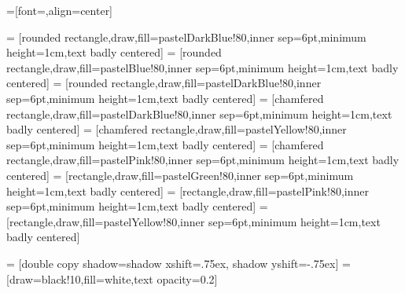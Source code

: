 
=[font=\sffamily,align=center]

\newcommand{\fillOpacity}{80}

\newcommand{\compShape}{rectangle}
\newcommand{\groupShape}{chamfered rectangle}
\newcommand{\procShape}{rounded rectangle}

\newcommand{\explicitColor}{pastelGreen}
\newcommand{\customColor}{pastelYellow}
\newcommand{\implicitColor}{pastelPink}
\newcommand{\optimizationColor}{pastelDarkBlue} %

 = [\procShape,draw,fill=\optimizationColor!\fillOpacity,inner sep=6pt,minimum height=1cm,text badly centered]
 = [\procShape,draw,fill=pastelBlue!\fillOpacity,inner sep=6pt,minimum height=1cm,text badly centered]
 = [\procShape,draw,fill=\optimizationColor!\fillOpacity,inner sep=6pt,minimum height=1cm,text badly centered]
 = [\groupShape,draw,fill=\optimizationColor!\fillOpacity,inner sep=6pt,minimum height=1cm,text badly centered]
 = [\groupShape,draw,fill=\customColor!\fillOpacity,inner sep=6pt,minimum height=1cm,text badly centered]
 = [\groupShape,draw,fill=\implicitColor!\fillOpacity,inner sep=6pt,minimum height=1cm,text badly centered]
 = [\compShape,draw,fill=\explicitColor!\fillOpacity,inner sep=6pt,minimum height=1cm,text badly centered]
 = [\compShape,draw,fill=\implicitColor!\fillOpacity,inner sep=6pt,minimum height=1cm,text badly centered]
 = [\compShape,draw,fill=pastelYellow!\fillOpacity,inner sep=6pt,minimum height=1cm,text badly centered]

 = [double copy shadow={shadow xshift=.75ex, shadow yshift=-.75ex}]
 = [draw=black!10,fill=white,text opacity=0.2]

